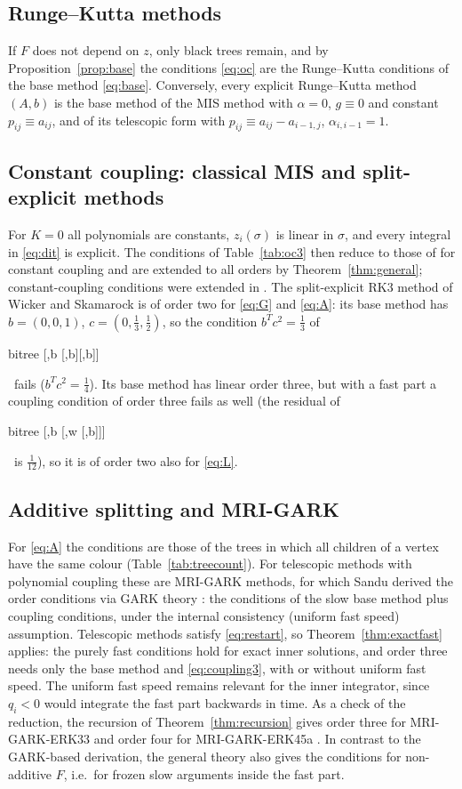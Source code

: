 \documentclass[11pt,a4paper]{article}
\theoremstyle{definition}
\theoremstyle{remark}
\newcommand{\btree}[1]{\begin{forest}bitree #1\end{forest}}
\newcommand{\Tbbb}{\btree{[,b [,b][,b]]}}
\newcommand{\Tbwbl}{\btree{[,b [,w [,b]]]}}
\begin{document}
\subsection{Runge--Kutta methods}
If $F$ does not depend on $z$, only black trees remain, and by Proposition~\ref{prop:base} the conditions
\eqref{eq:oc} are the Runge--Kutta conditions of the base method \eqref{eq:base}. Conversely, every explicit
Runge--Kutta method $(A,b)$ is the base method of the MIS method with $\alpha=0$, $g\equiv0$ and constant
$p_{ij}\equiv a_{ij}$, and of its telescopic form with $p_{ij}\equiv a_{ij}-a_{i-1,j}$, $\alpha_{i,i-1}=1$.

\subsection{Constant coupling: classical MIS and split-explicit methods}
For $K=0$ all polynomials are constants, $z_i(\sigma)$ is linear in $\sigma$, and every integral in \eqref{eq:dit} is
explicit. The conditions of Table~\ref{tab:oc3} then reduce to those of
\cite{WenschKnothGalant2009,KnothWensch2014} for constant coupling and are extended to all orders by
Theorem~\ref{thm:general}; constant-coupling conditions were extended in \cite{BauerKnoth2021}. The split-explicit RK3
method of Wicker and Skamarock is of order two for \eqref{eq:G} and \eqref{eq:A}: its base method has $b=(0,0,1)$,
$c=(0,\tfrac13,\tfrac12)$, so the condition $b^Tc^2=\tfrac13$ of \Tbbb\ fails ($b^Tc^2=\tfrac14$). Its base method has linear order three,
but with a fast part a coupling condition of order three fails as well (the residual of \Tbwbl\ is $\tfrac1{12}$), so
it is of order two also for \eqref{eq:L}.

\subsection{Additive splitting and MRI-GARK}
For \eqref{eq:A} the conditions are those of the trees in which all children of a vertex have the same colour
(Table~\ref{tab:treecount}). For telescopic methods with polynomial coupling these are MRI-GARK methods, for which
Sandu \cite{Sandu2019} derived the order conditions via GARK theory \cite{GuntherSandu2016}: the conditions of the slow
base method plus coupling conditions, under the internal consistency (uniform fast speed) assumption. Telescopic methods
satisfy \eqref{eq:restart}, so Theorem~\ref{thm:exactfast} applies: the purely fast conditions hold for exact inner
solutions, and order three needs only the base method and \eqref{eq:coupling3}, with or without uniform fast speed. The
uniform fast speed remains relevant for the inner integrator, since $q_i<0$ would integrate the fast part backwards in
time. As a check of the reduction, the recursion of Theorem~\ref{thm:recursion} gives order three for MRI-GARK-ERK33 and
order four for MRI-GARK-ERK45a \cite{Sandu2019}. In contrast to the GARK-based derivation, the general theory also gives
the conditions for non-additive $F$, i.e.\ for frozen slow arguments inside the fast part.
\end{document}
